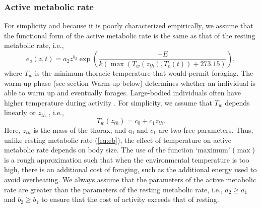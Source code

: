 \subsubsection*{Active metabolic rate}
For simplicity and because it is poorly characterized empirically, we assume that the functional form of the active metabolic rate is the same as that of the resting metabolic rate, i.e., 
\begin{equation} \label{eq:ea}
	e_a(z,t) = a_2 z^{b_2}  \exp \left(\frac{-E}{k (\max(T_w(z_{th}), T_e(t))+ 273.15)} \right),
\end{equation}
where $T_w$ is the minimum thoracic temperature that would permit foraging.
The warm-up phase (see section Warm-up below) determines whether an individual is able to warm up and eventually forages. %
Large-bodied individuals often have higher temperature during activity \citep{Bartholomew1977a}. %
For simplicity, we assume that $T_w$ depends linearly or $z_{th}$ \citep{Bartholomew1977a}, i.e.,
\begin{equation} \label{eq:Tw}
	T_w(z_{th}) = c_0+ c_1 z_{th}.
\end{equation}
Here, $z_{th}$ is the mass of the thorax, and $c_0$ and $c_1$ are two free parameters.
Thus, unlike resting metabolic rate (\cref{eq:eb}), the effect of temperature on active metabolic rate depends on body size.
The use of the function `maximum' ($\max$) is a rough approximation such that when the environmental temperature is too high, there is an additional cost of foraging, such as the additional energy used to avoid overheating. 
We always assume that the parameters of the active metabolic rate are greater than the parameters of the resting metabolic rate, i.e., $a_2 \geq a_1$ and $b_2 \geq b_1$ to ensure that the cost of activity exceeds that of resting.

